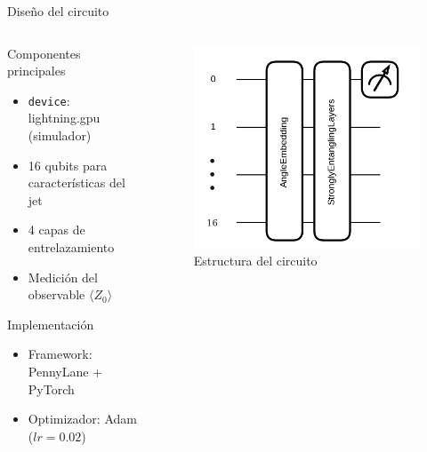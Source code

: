 \documentclass[aspectratio=43]{beamer}
\begin{document}
\begin{frame}{Diseño del circuito}
  \begin{columns}
    \begin{column}{0.55\textwidth}
      \begin{block}{Componentes principales}
        \begin{itemize}
          \item \texttt{device}: \alert{lightning.gpu} (simulador)
          \item 16 qubits para características del jet
          \item 4 capas de entrelazamiento
          \item Medición del observable $\langle Z_0\rangle$
        \end{itemize}
      \end{block}
      \begin{alertblock}{Implementación}
        \begin{itemize}
          \item Framework: PennyLane + PyTorch
          \item Optimizador: Adam ($lr=0.02$)
        \end{itemize}
      \end{alertblock}
    \end{column}
    \begin{column}{0.45\textwidth}
      \begin{figure}
        \includegraphics[width=\textwidth]{circuito.png}
        \caption{Estructura del circuito}
      \end{figure}
    \end{column}
  \end{columns}
\end{frame}
\end{document}
